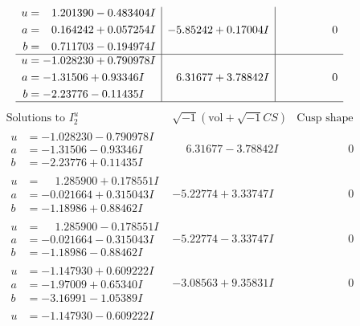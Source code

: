 \documentclass[1p]{elsarticle_modified}
\theoremstyle{definition}
\newcommand{\I}{\sqrt{-1}}
\begin{document}
$$\begin{array}{c|c|c}
\begin{aligned}
u &= \phantom{-}1.201390 - 0.483404 I \\
a &= \phantom{-}0.164242 + 0.057254 I \\
b &= \phantom{-}0.711703 - 0.194974 I\end{aligned}
 & -5.85242 + 0.17004 I & \phantom{-0.000000 } 0 \\ \hline\begin{aligned}
u &= -1.028230 + 0.790978 I \\
a &= -1.31506 + 0.93346 I \\
b &= -2.23776 - 0.11435 I\end{aligned}
 & \phantom{-}6.31677 + 3.78842 I & \phantom{-0.000000 } 0\\
 \hline 
 \end{array}$$\newpage$$\begin{array}{c|c|c}  
\text{Solutions to }I^u_{2}& \I (\text{vol} + \sqrt{-1}CS) & \text{Cusp shape}\\
 \hline 
\begin{aligned}
u &= -1.028230 - 0.790978 I \\
a &= -1.31506 - 0.93346 I \\
b &= -2.23776 + 0.11435 I\end{aligned}
 & \phantom{-}6.31677 - 3.78842 I & \phantom{-0.000000 } 0 \\ \hline\begin{aligned}
u &= \phantom{-}1.285900 + 0.178551 I \\
a &= -0.021664 + 0.315043 I \\
b &= -1.18986 + 0.88462 I\end{aligned}
 & -5.22774 + 3.33747 I & \phantom{-0.000000 } 0 \\ \hline\begin{aligned}
u &= \phantom{-}1.285900 - 0.178551 I \\
a &= -0.021664 - 0.315043 I \\
b &= -1.18986 - 0.88462 I\end{aligned}
 & -5.22774 - 3.33747 I & \phantom{-0.000000 } 0 \\ \hline\begin{aligned}
u &= -1.147930 + 0.609222 I \\
a &= -1.97009 + 0.65340 I \\
b &= -3.16991 - 1.05389 I\end{aligned}
 & -3.08563 + 9.35831 I & \phantom{-0.000000 } 0 \\ \hline\begin{aligned}
u &= -1.147930 - 0.609222 I \\

\end{aligned}
\end{array}$$
\end{document}
